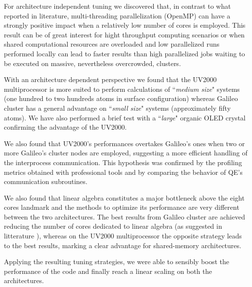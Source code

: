\documentclass[a4paper,10pt]{article}
\begin{document}
For architecture independent tuning we discovered that, in contrast to what reported in literature, multi-threading parallelization (OpenMP) can have a strongly positive impact when a relatively low number of cores is employed.
This result can be of great interest for hight throughput computing scenarios or when shared computational resources are overloaded and low parallelized runs performed locally can lead to faster results than high parallelized jobs waiting to be executed on massive, nevertheless overcrowded, clusters.

With an architecture dependent perspective we found that the UV2000 multiprocessor is more suited to perform calculations of ``\textit{medium size}" systems\cite{Titania1}\cite{prace} (one hundred to two hundreds atoms in surface configuration) whereas Galileo cluster has a general advantage on ``\textit{small size}" systems (approximately fifty atoms).
We have also performed a brief test with a ``\textit{large}" organic OLED crystal confirming the advantage of the UV2000.

We also found that UV2000's performances overtakes Galileo's ones when two or more Galileo's cluster nodes are employed, suggesting a more efficient handling of the interprocess communication. 
This hypothesis was confirmed by the profiling metrics obtained with professional tools and by comparing the behavior of QE's communication subroutines.

We also found that linear algebra constitutes a major bottleneck above the eight cores landmark and the methods to optimize its performance are very different between the two architectures.
The best results from Galileo cluster are achieved reducing the number of cores dedicated to linear algebra (as suggested in litterature \cite{QE2}), whereas on the UV2000 multiprocessor the opposite strategy leads to the best results, marking a clear advantage for shared-memory architectures.

Applying the resulting tuning strategies, we were able to sensibly boost the performance of the code and finally reach a linear scaling on both the architectures.
\end{document}
